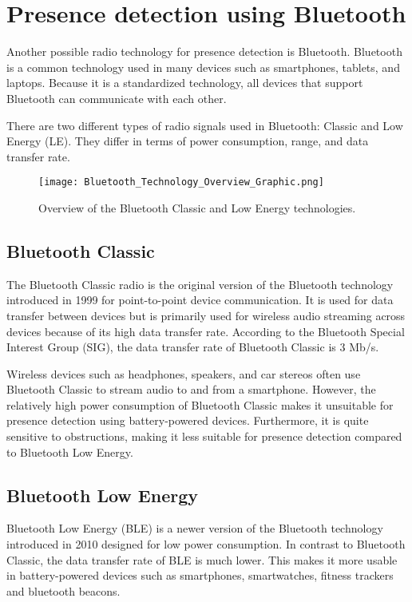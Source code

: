 \section{Presence detection using Bluetooth} \label{sec:bluetooth}
Another possible radio technology for presence detection is Bluetooth.
Bluetooth is a common technology used in many devices such as smartphones, tablets, and laptops.
Because it is a standardized technology, all devices that support Bluetooth can communicate with each other\cite{BluetoothOverview}.\cite{BluetoothSIG}

There are two different types of radio signals used in Bluetooth: Classic and Low Energy (LE).
They differ in terms of power consumption, range, and data transfer rate.\cite{BluetoothOverview}

\begin{figure}[h!]
  \centering
  \texttt{[image: Bluetooth\_Technology\_Overview\_Graphic.png]}
  \caption{Overview of the Bluetooth Classic and Low Energy technologies\cite{BluetoothOverview}.}
  \label{fig:classic_vs_LE}
\end{figure}

\subsection{Bluetooth Classic} \label{sec:bluetooth_classic}
The Bluetooth Classic radio is the original version of the Bluetooth technology introduced in 1999 for point-to-point device communication.
It is used for data transfer between devices but is primarily used for wireless audio streaming across devices because of its high data transfer rate.
According to the Bluetooth Special Interest Group (SIG), the data transfer rate of Bluetooth Classic is 3 Mb/s.\cite{BluetoothSIG}\cite{BluetoothOverview}

Wireless devices such as headphones, speakers, and car stereos often use Bluetooth Classic to stream audio to and from a smartphone.
However, the relatively high power consumption of Bluetooth Classic makes it unsuitable for presence detection using battery-powered devices.
Furthermore, it is quite sensitive to obstructions, making it less suitable for presence detection compared to Bluetooth Low Energy.\cite{BluetoothOverview}\cite{BluetoothAudioStreaming}

\subsection{Bluetooth Low Energy} \label{sec:bluetooth_low_energy}
Bluetooth Low Energy (BLE) is a newer version of the Bluetooth technology introduced in 2010 designed for low power consumption.
In contrast to Bluetooth Classic, the data transfer rate of BLE is much lower.
This makes it more usable in battery-powered devices such as smartphones, smartwatches, fitness trackers and bluetooth beacons.\cite{BLE_Regulatory_Aspects_Document}

